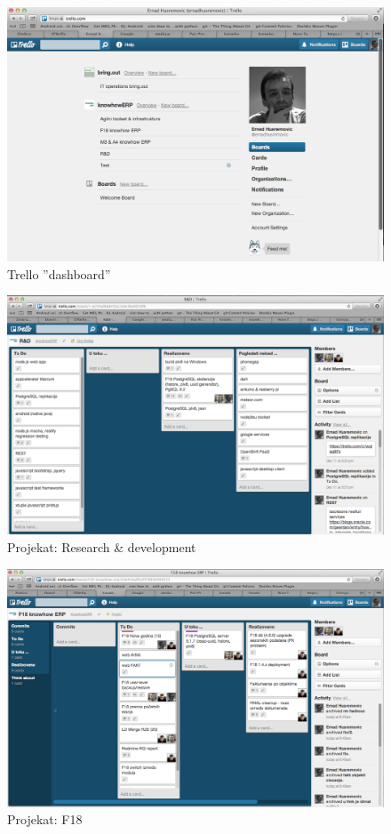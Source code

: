 \documentclass[times, utf8, seminar]{fit}
\begin{document}
\begin{figure}[H]
\centering
\includegraphics[width=14cm]{img/trello_dashboard.png}
\caption{Trello ''dashboard''}
\end{figure}


\begin{figure}[H]
\centering
\includegraphics[width=14cm]{img/trello_rd.png}
\caption{Projekat: Research \& development}
\end{figure}

\begin{figure}[H]
\centering
\includegraphics[width=14cm]{img/trello_f18.png}
\caption{Projekat: F18}
\end{figure}
\end{document}
